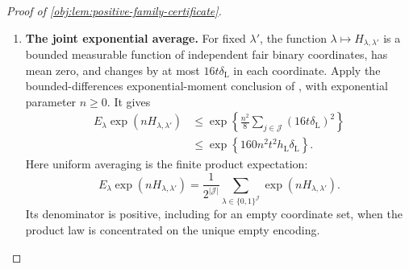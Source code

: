\documentclass[11pt]{article}
\begin{document}
\begin{proof}[Proof of \cref{obj:lem:positive-family-certificate}]
\begin{enumerate}
To count the coordinates, the strict intersection conditions defining
\(\mathcal J\) imply
\[
\frac{x_0-h_{\mathrm L}}{\delta_{\mathrm L}}<j+1,
\qquad
j-1<\frac{x_0+h_{\mathrm L}}{\delta_{\mathrm L}}.
\]
Taking integer bounds yields
\[
\mathcal J\subset
\left[
\left\lfloor\frac{x_0-h_{\mathrm L}}{\delta_{\mathrm L}}\right\rfloor,
\left\lceil\frac{x_0+h_{\mathrm L}}{\delta_{\mathrm L}}\right\rceil
\right]\cap\mathbb Z.
\]
Counting this integer interval and using the floor and ceiling bounds,
\[
\begin{aligned}
|\mathcal J|
&\le
\left\lceil\frac{x_0+h_{\mathrm L}}{\delta_{\mathrm L}}\right\rceil
-\left\lfloor\frac{x_0-h_{\mathrm L}}{\delta_{\mathrm L}}\right\rfloor+1\\
&\le\frac{2h_{\mathrm L}}{\delta_{\mathrm L}}+3
\le\frac{5h_{\mathrm L}}{\delta_{\mathrm L}}.
\end{aligned}
\]
The last inequality uses
\(0<\delta_{\mathrm L}=h_{\mathrm L}^5\le h_{\mathrm L}\).
Thus the squared coordinate-change budget satisfies
\[
\begin{aligned}
\sum_{j\in\mathcal J}(16t\delta_{\mathrm L})^2
&=|\mathcal J|(16t\delta_{\mathrm L})^2\\
&\le\frac{5h_{\mathrm L}}{\delta_{\mathrm L}}
                  (16t\delta_{\mathrm L})^2
=1280t^2h_{\mathrm L}\delta_{\mathrm L}.
\end{aligned}
\]

\item \textbf{The joint exponential average.}
For fixed \(\lambda'\), the function
\(\lambda\mapsto H_{\lambda,\lambda'}\) is a bounded measurable
function of independent fair binary coordinates, has mean zero,
and changes by at most \(16t\delta_{\mathrm L}\) in each coordinate.
Apply the bounded-differences exponential-moment conclusion of
\citep[Theorem~6.2, displayed log-mgf bound in its proof,
p.~167]{BoucheronLugosiMassart2013}, with exponential parameter
\(n\ge0\). It gives
\[
\begin{aligned}
E_\lambda\exp(nH_{\lambda,\lambda'})
&\le
\exp\!\left\{\frac{n^2}{8}
       \sum_{j\in\mathcal J}(16t\delta_{\mathrm L})^2\right\}\\
&\le\exp\!\left\{160n^2t^2h_{\mathrm L}\delta_{\mathrm L}\right\}.
\end{aligned}
\]
Here uniform averaging is the finite product expectation:
\[
E_\lambda\exp(nH_{\lambda,\lambda'})
=\frac1{2^{|\mathcal J|}}
  \sum_{\lambda\in\{0,1\}^{\mathcal J}}\exp(nH_{\lambda,\lambda'}).
\]
Its denominator is positive, including for an empty coordinate set,
when the product law is concentrated on the unique empty encoding.


\end{enumerate}
\end{proof}
\end{document}
